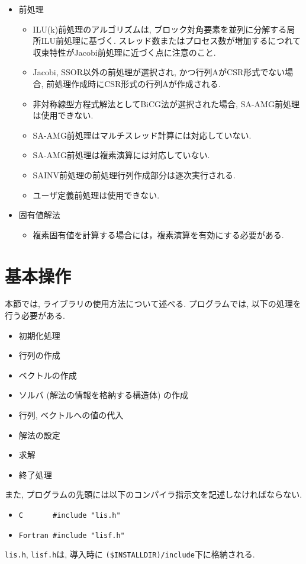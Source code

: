 \documentclass[a4paper]{jarticle}
\begin{document}
{{\begin{itemize}
\item 前処理
\begin{itemize}
\item ILU(k)前処理のアルゴリズムは, ブロック対角要素を並列に分解する局所ILU前処理\cite{nakajima}に基づく. スレッド数またはプロセス数が増加するにつれて収束特性がJacobi前処理に近づく点に注意のこと.
\item Jacobi, SSOR以外の前処理が選択され, かつ行列AがCSR形式でない場合,
      前処理作成時にCSR形式の行列Aが作成される.
\item 非対称線型方程式解法としてBiCG法が選択された場合, SA-AMG前処理は使用できない.
\item SA-AMG前処理はマルチスレッド計算には対応していない.
\item SA-AMG前処理は複素演算には対応していない.   
\item SAINV前処理の前処理行列作成部分は逐次実行される.
\item ユーザ定義前処理は使用できない.
\end{itemize}

\item 固有値解法
\begin{itemize}
\item 複素固有値を計算する場合には，複素演算を有効にする必要がある. 
\end{itemize}

\end{itemize}
\vspace*{5mm}

\newpage
\section{基本操作}
本節では, ライブラリの使用方法について述べる. 
プログラムでは, 以下の処理を行う必要がある. 
\begin{itemize}
\item 初期化処理
\item 行列の作成
\item ベクトルの作成
\item ソルバ (解法の情報を格納する構造体) の作成
\item 行列, ベクトルへの値の代入
\item 解法の設定
\item 求解
\item 終了処理
\end{itemize}
また, プログラムの先頭には以下のコンパイラ指示文を記述しなければならない. 
\begin{itemize}
\item \verb+C       #include "lis.h"+
\item \verb+Fortran #include "lisf.h"+
\end{itemize}
{\tt lis.h}, {\tt lisf.h}は, 導入時に
\verb|($INSTALLDIR)/include|下に格納される. 

}}
\end{document}
